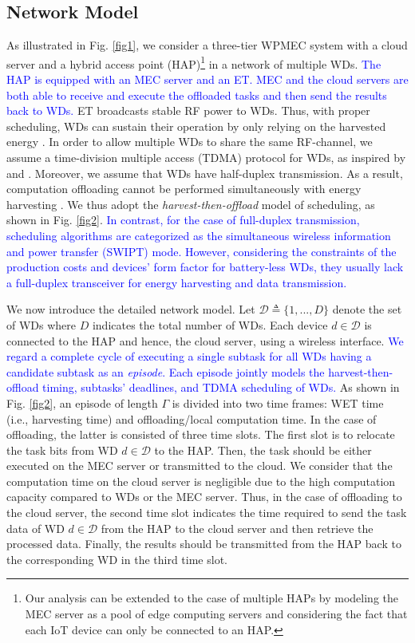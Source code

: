 \documentclass[12pt,draftclsnofoot,onecolumn]{IEEEtran}
\begin{document}
\subsection{Network Model}
As illustrated in Fig. \ref{fig1}, we consider a three-tier WPMEC system with a cloud server and a hybrid access point (HAP)\footnote{Our analysis can be extended to the case of multiple HAPs by modeling the MEC server as a pool of edge computing servers and considering the fact that each IoT device can only be connected to an HAP.} in a network of multiple WDs. \textcolor{blue}{The HAP is equipped with an MEC server and an ET. MEC and the cloud servers are both able to receive and execute the offloaded tasks and then send the results back to WDs.} ET broadcasts stable RF power to WDs. Thus, with proper scheduling, WDs can sustain their operation by only relying on the harvested energy \cite{b8}. In order to allow multiple WDs to share the same RF-channel, we assume a time-division multiple access (TDMA) protocol for WDs, as inspired by \cite{b11} and \cite{b14}. Moreover, we assume that WDs have half-duplex transmission. As a result, computation offloading cannot be performed simultaneously with energy harvesting \cite{b2}. We thus adopt the \textit{harvest-then-offload} \cite{b2} model of scheduling, as shown in Fig. \ref{fig2}. \textcolor{blue}{In contrast, for the case of full-duplex transmission, scheduling algorithms are categorized as the simultaneous wireless information and power transfer (SWIPT) \cite{b8} mode. However, considering the constraints of the production costs and devices' form factor for battery-less WDs, they usually lack a full-duplex transceiver for energy harvesting and data transmission.}

We now introduce the detailed network model. Let $\mathcal{D}\triangleq\{1,...,D\}$ denote the set of WDs where $D$ indicates the total number of WDs. Each device $d\in\mathcal{D}$ is connected to the HAP and hence, the cloud server, using a wireless interface. \textcolor{blue}{We regard a complete cycle of executing a single subtask for all WDs having a candidate subtask as an \textit{episode}. Each episode jointly models the harvest-then-offload timing, subtasks' deadlines, and TDMA‌ scheduling of WDs.} As shown in Fig. \ref{fig2}, an episode of length $\Gamma$ is divided into two time frames: WET time (i.e., harvesting time) and offloading/local computation time. In the case of offloading, the latter is consisted of three time slots. The first slot is to relocate the task bits from WD $d\in\mathcal{D}$ to the HAP. Then, the task should be either executed on the MEC server or transmitted to the cloud. We consider that the computation time on the cloud server is negligible due to the high computation capacity compared to WDs or the MEC server. Thus, in the case of offloading to the cloud server, the second time slot indicates the time required to send the task data of WD $d\in\mathcal{D}$ from the HAP to the cloud server and then retrieve the processed data. Finally, the results should be transmitted from the HAP back to the corresponding WD in the third time slot.
\end{document}
